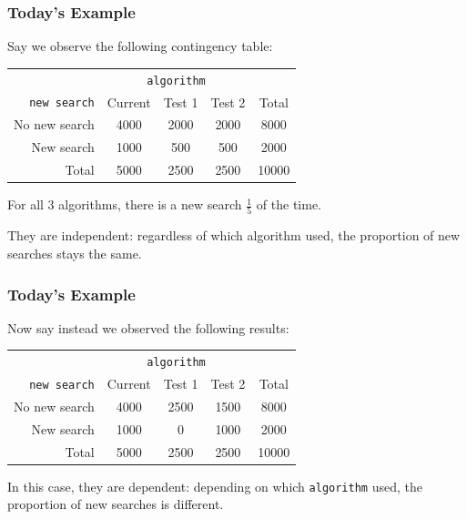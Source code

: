 \documentclass[handout]{beamer}
\newcommand{\blue}[1]{\textcolor{blue2}{#1}}
\begin{document}
\begin{frame}
\frametitle{Today's Example}

Say we observe the following contingency table:

\begin{center}
  \begin{tabular}{r|ccc|c}
& \multicolumn{3}{c|}{{\tt algorithm}} & \\
       {\tt new search} & Current & Test 1 & Test 2 & Total \\ 
\hline
    No new search & 4000 & 2000 & 2000 & 8000 \\ 
    New search & 1000 & 500 & 500 & 2000 \\ 
\hline
    Total & 5000 & 2500 & 2500 & 10000 \\ 
  \end{tabular}
\end{center}

\pause For all 3 algorithms, there is a new search $\frac{1}{5}$ of the time.

\vspace{0.25cm}

\pause They are \blue{independent}: regardless of which algorithm used, the proportion of new searches stays the same.

\end{frame}


\begin{frame}
\frametitle{Today's Example}

Now say instead we observed the following results:

\begin{center}
  \begin{tabular}{r|ccc|c}
& \multicolumn{3}{c|}{{\tt algorithm}} & \\
       {\tt new search} & Current & Test 1 & Test 2 & Total \\ 
\hline
    No new search & 4000 & 2500 & 1500 & 8000 \\ 
    New search & 1000 & 0 & 1000 & 2000 \\ 
\hline
    Total & 5000 & 2500 & 2500 & 10000 \\ 
  \end{tabular}
\end{center}

\vspace{0.25cm}

\pause In this case, they are \blue{dependent}: \blue{depending on} which {\tt algorithm} used, the proportion of new searches \blue{is different}.

\end{frame}
\end{document}
